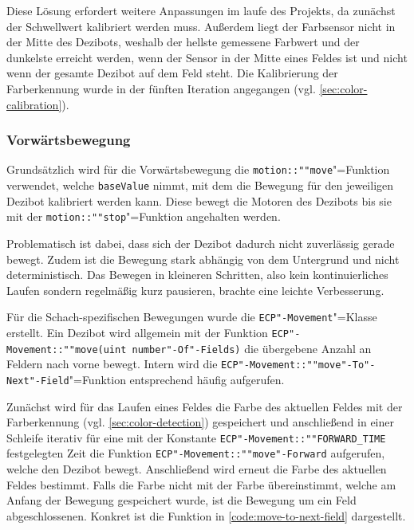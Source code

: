 Diese Lösung erfordert weitere Anpassungen im laufe des Projekts, da zunächst der Schwellwert kalibriert werden muss. Außerdem liegt der Farbsensor nicht in der Mitte des Dezibots, weshalb der hellste gemessene Farbwert und der dunkelste erreicht werden, wenn der Sensor in der Mitte eines Feldes ist und nicht wenn der gesamte Dezibot auf dem Feld steht. Die Kalibrierung der Farberkennung wurde in der fünften Iteration angegangen (vgl. \autoref{sec:color-calibration}).


\subsubsection{Vorwärtsbewegung}
\label{sec:move-straight}

Grundsätzlich wird für die Vorwärtsbewegung die \texttt{motion::""move}"=Funktion verwendet, welche \texttt{baseValue} nimmt, mit dem die Bewegung für den jeweiligen Dezibot kalibriert werden kann. Diese bewegt die Motoren des Dezibots bis sie mit der \texttt{motion::""stop}"=Funktion angehalten werden. 

Problematisch ist dabei, dass sich der Dezibot dadurch nicht zuverlässig gerade bewegt. Zudem ist die Bewegung stark abhängig von dem Untergrund und nicht deterministisch. Das Bewegen in kleineren Schritten, also kein kontinuierliches Laufen sondern regelmäßig kurz pausieren, brachte eine leichte Verbesserung. 

Für die Schach-spezifischen Bewegungen wurde die \texttt{ECP"-Movement}"=Klasse erstellt. Ein Dezibot wird allgemein mit der Funktion \texttt{ECP"-Movement::""move(uint number"-Of"-Fields)} die übergebene Anzahl an Feldern nach vorne bewegt. Intern wird die \texttt{ECP"-Movement::""move"-To"-Next"-Field}"=Funktion entsprechend häufig aufgerufen.

Zunächst wird für das Laufen eines Feldes die Farbe des aktuellen Feldes mit der Farberkennung (vgl. \autoref{sec:color-detection}) gespeichert und anschließend in einer Schleife iterativ für eine mit der Konstante \texttt{ECP"-Movement::""FORWARD\_TIME} festgelegten Zeit die Funktion \texttt{ECP"-Movement::""move"-Forward} aufgerufen, welche den Dezibot bewegt. Anschließend wird erneut die Farbe des aktuellen Feldes bestimmt. Falls die Farbe nicht mit der Farbe übereinstimmt, welche am Anfang der Bewegung gespeichert wurde, ist die Bewegung um ein Feld abgeschlossenen. Konkret ist die Funktion in \autoref{code:move-to-next-field} dargestellt.

\begin{listing}[h]
    \inputminted{cpp}{../assets/code/ECPMovement-moveToNextField.cpp}
    \caption{Code"=Ausschnitt zur \texttt{ECP"-Movement::""move"-To"-Next"-Field}"=Funktion.}
    \label{code:move-to-next-field}
\end{listing}

